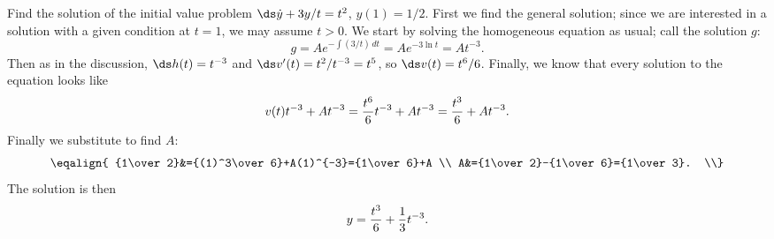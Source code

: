 \begin{example} Find the solution of the initial value problem
$\ds \dot y+3y/t=t^2$, $y(1)=1/2$. First we find the general solution;
since we are interested in a solution with a given condition at $t=1$,
we may assume $t>0$.
We start by solving the homogeneous equation as usual; call the
solution $g$:
$$g=Ae^{-\int (3/t)\,dt}=Ae^{-3\ln t}=At^{-3}.$$
Then as in the discussion, $\ds h(t)=t^{-3}$ and
$\ds v'(t)=t^2/t^{-3}=t^5$, so $\ds v(t)=t^6/6$. Finally, we know that
every solution to the equation looks like
$$v(t)t^{-3}+At^{-3}={t^6\over6}t^{-3}+At^{-3}={t^3\over6}+At^{-3}.$$
Finally we substitute to find $A$:
$$\eqalign{
{1\over 2}&={(1)^3\over6}+A(1)^{-3}={1\over6}+A \\
A&={1\over 2}-{1\over6}={1\over3}. \\}
$$
The solution is then
$$y={t^3\over6}+{1\over3}t^{-3}.$$
\end{example}


